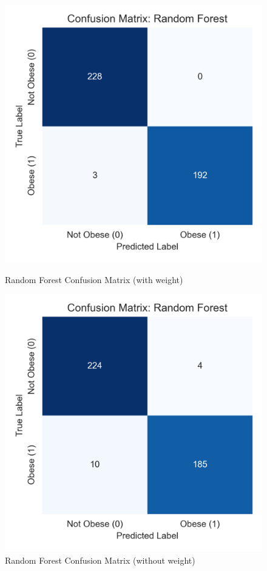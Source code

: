 \documentclass[a4paper,12pt]{article}
\begin{document}
\begin{figure}[H]
\centering
\begin{minipage}{0.35\textwidth}
    \centering
    \includegraphics[width=\linewidth]{random_forest_confusion.png}
    \caption{Random Forest Confusion Matrix (with weight)}
\end{minipage}
\hspace{0.04\textwidth}
\begin{minipage}{0.35\textwidth}
    \centering
    \includegraphics[width=\linewidth]{random_forest_confusion_withoutWeight.png}
    \caption{Random Forest Confusion Matrix (without weight)}
\end{minipage}
\label{fig:Random_Forest_weight_comparison}
\end{figure}
\end{document}
